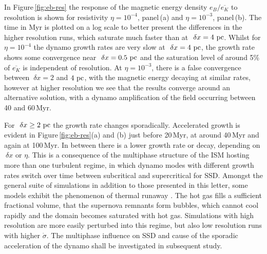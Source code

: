 \documentclass[preprint2]{aastex63}
\newcommand\pc{~ {\rm pc}}
\newcommand\dx{~ {\delta x}}
\begin{document}
In Figure\,\ref{fig:eb-res} the response of the magnetic energy density 
$e_B/\overline{e_K}$ to resolution is shown for resistivity $\eta=10^{-4}$,
panel\,(a) and $\eta=10^{-3}$, panel\,(b).
The time in Myr is plotted on a log scale to better present the differences in 
the higher resolution runs, which saturate much faster than at $\dx=4\pc$.
Whilst for $\eta=10^{-4}$ the dynamo growth rates are very slow at $\dx=4\pc$,
the growth rate shows some convergence near $\dx=0.5\pc$ and the saturation
level of around 5\% of $\overline{e_K}$ is independent of resolution.
At $\eta=10^{-3}$, there is a {false convergence} \citep{FMA91} between
$\dx=2$ and $4\pc$, with the magnetic energy decaying at similar rates, however
at higher resolution we see that the results converge around an alternative
solution, with a dynamo amplification of the field occurring between
40 and 60\,Myr.

For $\dx\geq2\pc$ the growth rate changes sporadically.
Accelerated growth is evident in Figure\,\ref{fig:eb-res}(a) and (b) just
before 20\,Myr, at around 40\,Myr and again at 100\,Myr.
In between there is a lower growth rate or decay, depending on $\dx$ or $\eta$.
This is a consequence of the multiphase structure of the ISM hosting more than
one turbulent regime, in which dynamo modes with different growth rates 
switch over time between subcritical and supercritical for SSD.
Amongst the general suite of simulations in addition to those presented in this
letter, some models exhibit the phenomenon of thermal runaway
\citep[see e.g.,][]{LOCBN15}.
The hot gas fills a sufficient fractional volume, that the supernova remnants 
form bubbles, which cannot cool rapidly and the domain becomes saturated 
with hot gas.
Simulations with high resolution are more easily perturbed into this regime, but
also low resolution runs with higher $\dot\sigma$.
The multiphase influence on SSD and cause of the sporadic acceleration of the
dynamo shall be investigated in subsequent study.
%
\end{document}
